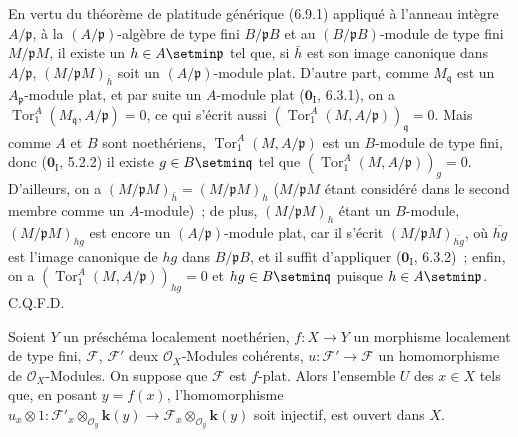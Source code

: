 En vertu du théorème de platitude générique (6.9.1) appliqué à l'anneau
intègre $A/\mathfrak p$, à la $(A/\mathfrak p)$-algèbre de type fini
$B/\mathfrak pB$ et au $(B/\mathfrak pB)$-module de type fini
$M/\mathfrak pM$, il existe un $h\in A\setmin\mathfrak p$ tel que, si $\bar h$ est
son image canonique dans $A/\mathfrak p$,
$(M/\mathfrak pM)_{\bar h}$ soit un $(A/\mathfrak p)$-module plat. D'autre
part, comme $M_{\mathfrak q}$ est un $A_{\mathfrak p}$-module plat, et par
suite un $A$-module plat ($\mathbf 0_{\mathrm I}$, 6.3.1), on a
$\operatorname{Tor}_1^A(M_{\mathfrak q},A/\mathfrak p)=0$, ce qui s'écrit
aussi
$(\operatorname{Tor}_1^A(M,A/\mathfrak p))_{\mathfrak q}=0$. Mais comme $A$
et $B$ sont noethériens, $\operatorname{Tor}_1^A(M,A/\mathfrak p)$ est un
$B$-module de type fini, donc ($\mathbf 0_{\mathrm I}$, 5.2.2) il existe
$g\in B\setmin\mathfrak q$ tel que
$(\operatorname{Tor}_1^A(M,A/\mathfrak p))_g=0$. D'ailleurs, on a
$(M/\mathfrak pM)_{\bar h}=(M/\mathfrak pM)_h$ ($M/\mathfrak pM$ étant
considéré dans le second membre comme un $A$-module)~; de plus,
$(M/\mathfrak pM)_h$ étant un $B$-module,
$(M/\mathfrak pM)_{hg}$ est encore un $(A/\mathfrak p)$-module plat, car il
s'écrit $(M/\mathfrak pM)_{\overline{hg}}$, où $\overline{hg}$ est l'image
canonique de $hg$ dans $B/\mathfrak pB$, et il suffit d'appliquer
($\mathbf 0_{\mathrm I}$, 6.3.2)~; enfin, on a
$(\operatorname{Tor}_1^A(M,A/\mathfrak p))_{hg}=0$ et
$hg\in B\setmin\mathfrak q$ puisque $h\in A\setmin\mathfrak p$. C.Q.F.D.

\begin{corollary}[11.1.2]
\label{IV.11.1.2-fr}
Soient $Y$ un préschéma localement noethérien, $f:X\to Y$ un morphisme
localement de type fini, $\mathcal F$, $\mathcal F'$ deux
$\mathcal O_X$-Modules cohérents,
$u:\mathcal F'\to\mathcal F$ un homomorphisme de $\mathcal O_X$-Modules. On
suppose que $\mathcal F$ est $f$-plat. Alors l'ensemble $U$ des $x\in X$ tels
que, en posant $y=f(x)$, l'homomorphisme
$u_x\otimes1:\mathcal F'_x\otimes_{\mathcal O_y}\boldsymbol{k}(y)\longrightarrow
  \mathcal F_x\otimes_{\mathcal O_y}\boldsymbol{k}(y)$
soit injectif, est ouvert dans $X$.
\end{corollary}

